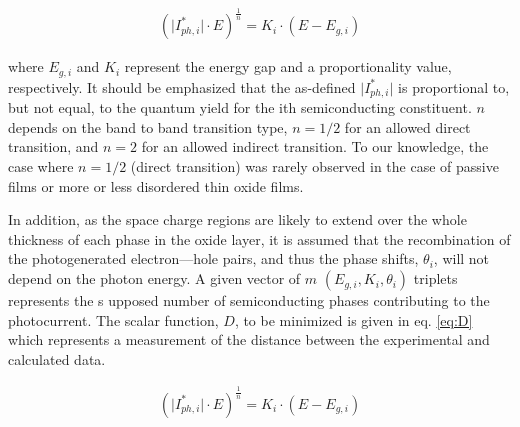 \begin{equation}
\begin{split}
\left( \vert I_{ph,i}^* \vert \cdot E \right)^{\frac{1}{n}} = K_i \cdot \left(  E - E_{g,i}  \right)
\end{split}
\label{eq:model}
\end{equation}

\noindent where $E_{g,i}$ and $K_i$ represent the energy gap and a proportionality 
value, respectively. It should be emphasized that the as-defined 
$\vert I_{ph,i}^* \vert$ is proportional to, but not equal, to the quantum 
yield for the ith semiconducting constituent. $n$ depends on the band to band 
transition type, $n = 1/2$ for an allowed direct transition, and $n = 2$ for 
an allowed indirect transition. To our knowledge, the case where $n = 1/2$ 
(direct transition) was rarely observed in the case of passive films or more 
or less disordered thin oxide films.

In addition, as the space charge regions are likely to extend over the whole 
thickness of each phase in the oxide layer, it is assumed that the recombination 
of the photogenerated electron---hole pairs, and thus the phase shifts, 
$\theta _i$, will not depend on the photon energy.
A given vector of $m$ $(E_{g,i}, K_i , \theta_i)$ triplets represents the s
upposed number of semiconducting phases contributing to the photocurrent. 
The scalar function, $D$, to be minimized is given in  eq. \ref{eq:D} which 
represents a measurement of the distance between the experimental and calculated 
data.

\begin{equation}
\begin{split}
\left( \vert I_{ph,i}^* \vert \cdot E \right)^{\frac{1}{n}} = K_i \cdot \left(  E - E_{g,i}  \right)
\end{split}
\label{eq:D}
\end{equation}
